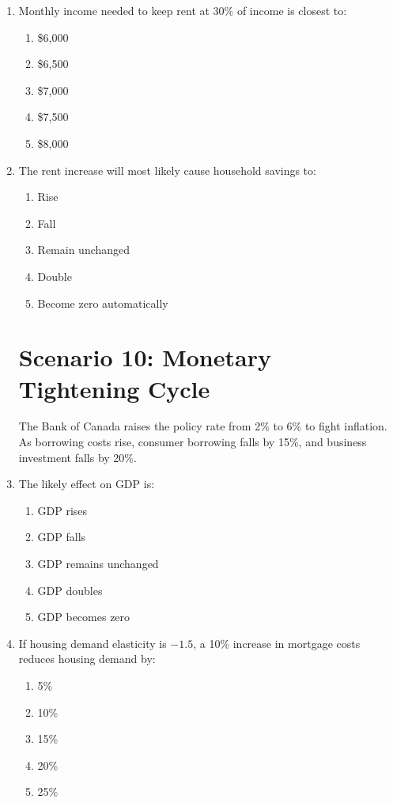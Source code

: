 \documentclass[12pt]{article}
\begin{document}
\begin{enumerate}[label=\textbf{\arabic*.}]
\item Monthly income needed to keep rent at 30\% of income is closest to:
\begin{enumerate}[label=\Alph*.]
\item \$6,000
\item \$6,500
\item \$7,000
\item \$7,500
\item \$8,000
\end{enumerate}
\newpage
\item The rent increase will most likely cause household savings to:
\begin{enumerate}[label=\Alph*.]
\item Rise
\item Fall
\item Remain unchanged
\item Double
\item Become zero automatically
\end{enumerate}

\section*{Scenario 10: Monetary Tightening Cycle}

The Bank of Canada raises the policy rate from 2\% to 6\% to fight inflation. As borrowing costs rise, consumer borrowing falls by 15\%, and business investment falls by 20\%.

\item The likely effect on GDP is:
\begin{enumerate}[label=\Alph*.]
\item GDP rises
\item GDP falls
\item GDP remains unchanged
\item GDP doubles
\item GDP becomes zero
\end{enumerate}

\item If housing demand elasticity is \(-1.5\), a 10\% increase in mortgage costs reduces housing demand by:
\begin{enumerate}[label=\Alph*.]
\item 5\%
\item 10\%
\item 15\%
\item 20\%
\item 25\%
\end{enumerate}


\end{enumerate}
\end{document}
